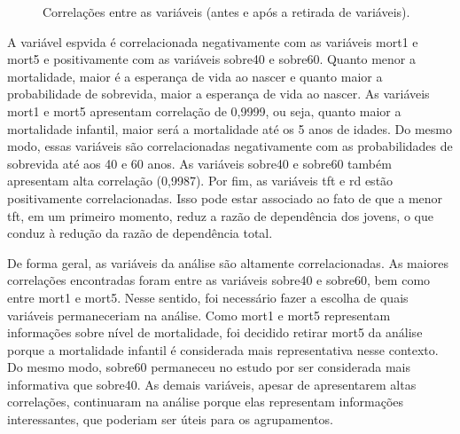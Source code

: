 \documentclass[10pt,twoside]{article}
\begin{document}
\begin{figure}[htp!]

\center
{}
\qquad
{}
\caption{Correlações entre as variáveis (antes e após a retirada de variáveis).}
\label{cor}
\end{figure}
	
A variável espvida é correlacionada negativamente com as variáveis mort1 e mort5 e positivamente com as variáveis sobre40 e sobre60. Quanto menor a mortalidade, maior é a esperança de vida ao nascer e quanto maior a probabilidade de sobrevida, maior a esperança de vida ao nascer. As variáveis mort1 e mort5 apresentam correlação de 0,9999, ou seja, quanto maior a mortalidade infantil, maior será a mortalidade até os 5 anos de idades. Do mesmo modo, essas variáveis são correlacionadas negativamente com as probabilidades de sobrevida até aos 40 e 60 anos. As variáveis sobre40 e sobre60 também apresentam alta correlação (0,9987). Por fim, as variáveis tft e rd estão positivamente correlacionadas. Isso pode estar associado ao fato de que a menor tft, em um primeiro momento, reduz a razão de dependência dos jovens, o que conduz à redução da razão de dependência total. 

De forma geral, as variáveis da análise são altamente correlacionadas. As maiores correlações encontradas foram entre as variáveis sobre40 e sobre60, bem como entre mort1 e mort5. Nesse sentido, foi necessário fazer a escolha de quais variáveis permaneceriam na análise. Como mort1 e mort5 representam informações sobre nível de mortalidade, foi decidido retirar mort5 da análise porque a mortalidade infantil é considerada mais representativa nesse contexto. Do mesmo modo, sobre60 permaneceu no estudo por ser considerada mais informativa que sobre40. As demais variáveis, apesar de apresentarem altas correlações, continuaram na análise porque elas representam informações interessantes, que poderiam ser úteis para os agrupamentos.
\end{document}
